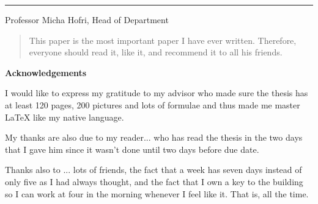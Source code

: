 \documentclass[12pt]{report}
\begin{document}
\vspace{0.5in}
\rule{3in}{0.8pt}

Professor Micha Hofri, Head of Department	


\newpage

%
\doublespacing

%
\begin{abstract}
This paper is the most important paper I have ever written. Therefore,
everyone should read it, like it, and recommend it to all his friends.
\end{abstract}



%
\begin{center}
	\textbf{Acknowledgements}
\end{center}

	I would like to express my gratitude to my advisor who made
	sure the thesis has at least 120 pages, 200 pictures and lots
	of formulae and thus made me master \LaTeX{} like my native
	language.

        My thanks are also due to my reader... who has read the thesis
        in the two days that I gave him since it wasn't done until two
        days before due date.

	Thanks also to ... lots of friends, the fact that a week has
	seven days instead of only five as I had always thought, and
	the fact that I own a key to the building so I can work at four
	in the morning whenever I feel like it. That is, all the time.

\end{document}
